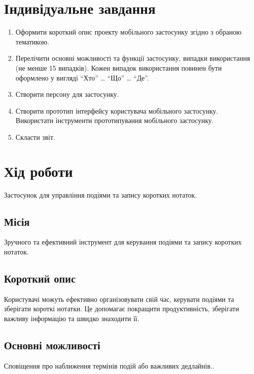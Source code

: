 \documentclass[oneside,14pt]{extarticle}
\begin{document}
\begin{normalsize}
	\section*{Індивідуальне завдання}
	\begin{enumerate}
		\item Оформити короткий опис проекту мобільного застосунку згідно з обраною тематикою.
		\item Перелічити основні можливості та функції застосунку, випадки використання (не менше 15 випадків). Кожен випадок використання повинен бути оформлено у вигляді “Хто” … “Що” … “Де”.
		\item Створити персону для застосунку.
		\item Створити прототип інтерфейсу користувача мобільного застосунку. Використати інструменти прототипування мобільного застосунку.
		\item Скласти звіт.
	\end{enumerate}
	
	\section*{Хід роботи}
	
	Застосунок для управління подіями та запису коротких нотаток.
	
	\subsection*{Місія}
	Зручного та ефективний інструмент для керування подіями та запису коротких нотаток.
	
	\subsection*{Короткий опис}
	Користувачі можуть ефективно організовувати свій час, керувати подіями та зберігати короткі нотатки. Це допомагає покращити продуктивність, зберігати важливу інформацію та швидко знаходити її.
	
	\subsection*{Основні можливості}
	Сповіщення про наближення термінів подій або важливих дедлайнів..
	

\end{normalsize}
\end{document}
